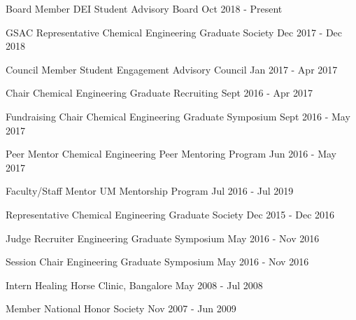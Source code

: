 \begin{cvhonors}[1.5cm]  \cvhonor
    {Board Member} %
    {DEI Student Advisory Board} %
    {} %
    {Oct 2018 - Present} %

  \cvhonor
    {GSAC Representative} %
    {Chemical Engineering Graduate Society} %
    {} %
    {Dec 2017 - Dec 2018} %

  \cvhonor
    {Council Member} %
    {Student Engagement Advisory Council} %
    {} %
    {Jan 2017 - Apr 2017} %

  \cvhonor
    {Chair} %
    {Chemical Engineering Graduate Recruiting} %
    {} %
    {Sept 2016 - Apr 2017} %

  \cvhonor
    {Fundraising Chair} %
    {Chemical Engineering Graduate Symposium} %
    {} %
    {Sept 2016 - May 2017} %

  \cvhonor
    {Peer Mentor} %
    {Chemical Engineering Peer Mentoring Program} %
    {} %
    {Jun 2016 - May 2017} %

  \cvhonor
    {Faculty/Staff Mentor} %
    {UM Mentorship Program} %
    {} %
    {Jul 2016 - Jul 2019} %

  \cvhonor
    {Representative} %
    {Chemical Engineering Graduate Society} %
    {} %
    {Dec 2015 - Dec 2016} %

  \cvhonor
    {Judge Recruiter} %
    {Engineering Graduate Symposium} %
    {} %
    {May 2016 - Nov 2016} %

  \cvhonor
    {Session Chair} %
    {Engineering Graduate Symposium} %
    {} %
    {May 2016 - Nov 2016} %

  \cvhonor
    {Intern} %
    {Healing Horse Clinic, Bangalore} %
    {} %
    {May 2008 - Jul 2008} %

  \cvhonor
    {Member} %
    {National Honor Society} %
    {} %
    {Nov 2007 - Jun 2009} %

\end{cvhonors}